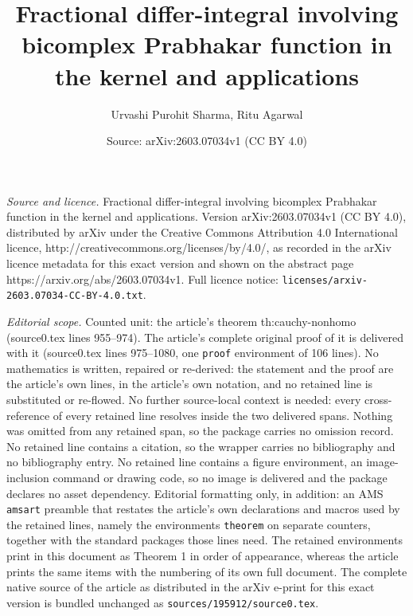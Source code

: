 \documentclass[10pt,a4paper]{amsart}
\title{Fractional differ-integral involving bicomplex Prabhakar function in the kernel and applications}
\author{Urvashi Purohit Sharma, Ritu Agarwal}
\date{Source: arXiv:2603.07034v1 (CC BY 4.0)}
\begin{document}
\maketitle

\noindent\emph{Source and licence.} Fractional differ-integral involving bicomplex Prabhakar function in the kernel and applications. Version arXiv:2603.07034v1 (CC BY 4.0), distributed by arXiv under the Creative Commons Attribution 4.0 International licence, http://creativecommons.org/licenses/by/4.0/, as recorded in the arXiv licence metadata for this exact version and shown on the abstract page https://arxiv.org/abs/2603.07034v1. Full licence notice: \texttt{licenses/arxiv-2603.07034-CC-BY-4.0.txt}.\par\smallskip

\noindent\textit{Editorial scope.} Counted unit: the article's theorem th:cauchy-nonhomo (source0.tex lines 955--974). The article's complete original proof of it is delivered with it (source0.tex lines 975--1080, one \texttt{proof} environment of 106 lines). No mathematics is written, repaired or re-derived: the statement and the proof are the article's own lines, in the article's own notation, and no retained line is substituted or re-flowed.  No further source-local context is needed: every cross-reference of every retained line resolves inside the two delivered spans.  Nothing was omitted from any retained span, so the package carries no omission record.  No retained line contains a citation, so the wrapper carries no bibliography and no bibliography entry.  No retained line contains a figure environment, an image-inclusion command or drawing code, so no image is delivered and the package declares no asset dependency.  Editorial formatting only, in addition: an AMS \texttt{amsart} preamble that restates the article's own declarations and macros used by the retained lines, namely the environments \texttt{theorem} on separate counters, together with the standard packages those lines need.  The retained environments print in this document as Theorem 1 in order of appearance, whereas the article prints the same items with the numbering of its own full document.  The complete native source of the article as distributed in the arXiv e-print for this exact version is bundled unchanged as \texttt{sources/195912/source0.tex}.
\end{document}
